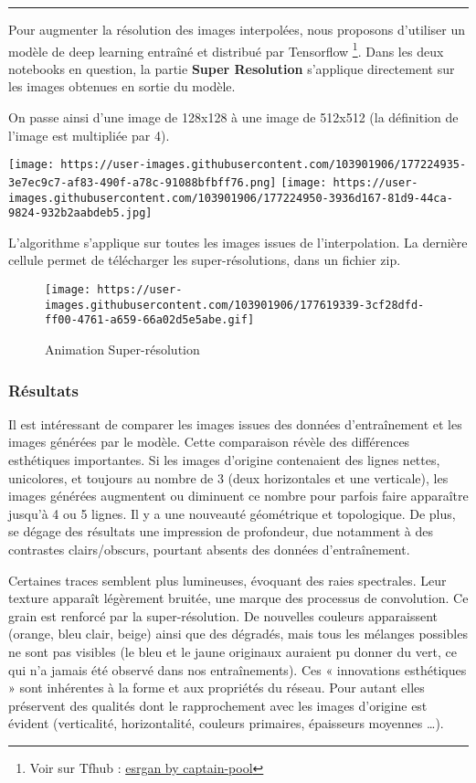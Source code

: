 \documentclass[
]{article}
\begin{document}
\begin{center}\rule{0.5\linewidth}{0.5pt}\end{center}

Pour augmenter la résolution des images interpolées, nous proposons d'utiliser un modèle de deep learning entraîné et distribué par Tensorflow \footnote{Voir sur Tfhub : \href{https://tfhub.dev/captain-pool/esrgan-tf2/1}{esrgan by captain-pool}}. Dans les deux notebooks en question, la partie \textbf{Super Resolution} s'applique directement sur les images obtenues en sortie du modèle.

On passe ainsi d'une image de 128x128 à une image de 512x512 (la définition de l'image est multipliée par 4).

\texttt{[image: https://user-images.githubusercontent.com/103901906/177224935-3e7ec9c7-af83-490f-a78c-91088bfbff76.png]} \texttt{[image: https://user-images.githubusercontent.com/103901906/177224950-3936d167-81d9-44ca-9824-932b2aabdeb5.jpg]}

L'algorithme s'applique sur toutes les images issues de l'interpolation. La dernière cellule permet de télécharger les super-résolutions, dans un fichier zip.

\begin{figure}
\centering
\texttt{[image: https://user-images.githubusercontent.com/103901906/177619339-3cf28dfd-ff00-4761-a659-66a02d5e5abe.gif]}
\caption{Animation Super-résolution}
\end{figure}

\hypertarget{ruxe9sultats}{%
\subsubsection{Résultats}\label{ruxe9sultats}}

Il est intéressant de comparer les images issues des données d'entraînement et les images générées par le modèle. Cette comparaison révèle des différences esthétiques importantes. Si les images d'origine contenaient des lignes nettes, unicolores, et toujours au nombre de 3 (deux horizontales et une verticale), les images générées augmentent ou diminuent ce nombre pour parfois faire apparaître jusqu'à 4 ou 5 lignes. Il y a une nouveauté géométrique et topologique. De plus, se dégage des résultats une impression de profondeur, due notamment à des contrastes clairs/obscurs, pourtant absents des données d'entraînement.

Certaines traces semblent plus lumineuses, évoquant des raies spectrales. Leur texture apparaît légèrement bruitée, une marque des processus de convolution. Ce grain est renforcé par la super-résolution. De nouvelles couleurs apparaissent (orange, bleu clair, beige) ainsi que des dégradés, mais tous les mélanges possibles ne sont pas visibles (le bleu et le jaune originaux auraient pu donner du vert, ce qui n'a jamais été observé dans nos entraînements). Ces « innovations esthétiques » sont inhérentes à la forme et aux propriétés du réseau. Pour autant elles préservent des qualités dont le rapprochement avec les images d'origine est évident (verticalité, horizontalité, couleurs primaires, épaisseurs moyennes \ldots).
\end{document}
